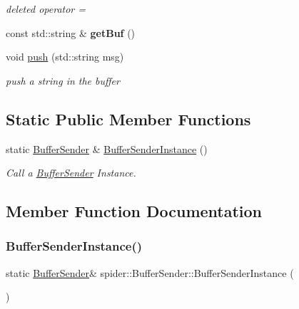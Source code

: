 \begin{DoxyCompactItemize}
\begin{DoxyCompactList}\small\item\em deleted operator = \end{DoxyCompactList}\item 
\mbox{\label{classspider_1_1_buffer_sender_a57e8eca1a06457a7a67abfa1e26869fc}} 
const std\+::string \& {\bfseries get\+Buf} ()
\item 
\mbox{\label{classspider_1_1_buffer_sender_af95249b9c33c991c964d2f11c6d7a30e}} 
void \hyperlink{classspider_1_1_buffer_sender_af95249b9c33c991c964d2f11c6d7a30e}{push} (std\+::string msg)
\begin{DoxyCompactList}\small\item\em push a string in the buffer \end{DoxyCompactList}\end{DoxyCompactItemize}
\subsection*{Static Public Member Functions}
\begin{DoxyCompactItemize}
\item 
static \hyperlink{classspider_1_1_buffer_sender}{Buffer\+Sender} \& \hyperlink{classspider_1_1_buffer_sender_abb8ca10bee486a204e37f6dbd4b17a14}{Buffer\+Sender\+Instance} ()
\begin{DoxyCompactList}\small\item\em Call a \hyperlink{classspider_1_1_buffer_sender}{Buffer\+Sender} Instance. \end{DoxyCompactList}\end{DoxyCompactItemize}


\subsection{Member Function Documentation}
\mbox{\label{classspider_1_1_buffer_sender_abb8ca10bee486a204e37f6dbd4b17a14}} 
\subsubsection{\texorpdfstring{Buffer\+Sender\+Instance()}{BufferSenderInstance()}}
{\footnotesize\ttfamily static \hyperlink{classspider_1_1_buffer_sender}{Buffer\+Sender}\& spider\+::\+Buffer\+Sender\+::\+Buffer\+Sender\+Instance (\begin{DoxyParamCaption}{ }\end{DoxyParamCaption})\hspace{0.3cm}{\ttfamily [static]}}



